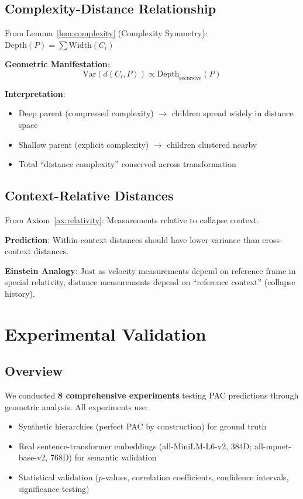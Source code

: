 \documentclass[11pt,a4paper]{article}
\begin{document}
\subsection{Complexity-Distance Relationship}

From Lemma~\ref{lem:complexity} (Complexity Symmetry): $\text{Depth}(P) = \sum \text{Width}(C_i)$

\textbf{Geometric Manifestation}:
\begin{equation}
\text{Var}(d(C_i, P)) \propto \text{Depth}_{\text{recursive}}(P)
\end{equation}

\textbf{Interpretation}:
\begin{itemize}
    \item Deep parent (compressed complexity) $\to$ children spread widely in distance space
    \item Shallow parent (explicit complexity) $\to$ children clustered nearby
    \item Total ``distance complexity'' conserved across transformation
\end{itemize}

\subsection{Context-Relative Distances}

From Axiom~\ref{ax:relativity}: Measurements relative to collapse context.

\textbf{Prediction}: Within-context distances should have lower variance than cross-context distances.

\textbf{Einstein Analogy}: Just as velocity measurements depend on reference frame in special relativity, distance measurements depend on ``reference context'' (collapse history).

\section{Experimental Validation}

\subsection{Overview}

We conducted \textbf{8 comprehensive experiments} testing PAC predictions through geometric analysis. All experiments use:
\begin{itemize}
    \item Synthetic hierarchies (perfect PAC by construction) for ground truth
    \item Real sentence-transformer embeddings (all-MiniLM-L6-v2, 384D; all-mpnet-base-v2, 768D) for semantic validation
    \item Statistical validation ($p$-values, correlation coefficients, confidence intervals, significance testing)
\end{itemize}
\end{document}
